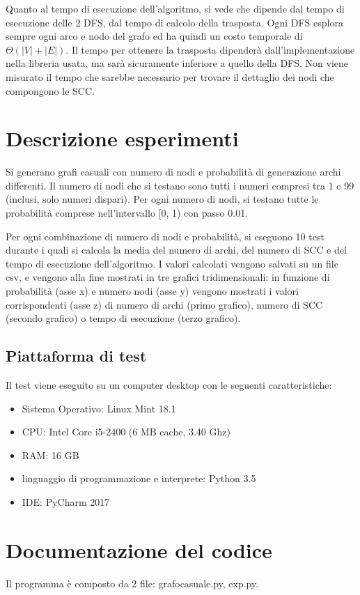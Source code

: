 \documentclass[]{article}
\begin{document}
Quanto al tempo di esecuzione dell'algoritmo, si vede che dipende dal tempo di esecuzione delle 2 DFS, dal tempo di calcolo della trasposta. Ogni DFS esplora sempre ogni arco e nodo del grafo ed ha quindi un costo temporale di $\Theta(|V|+|E|)$. Il tempo per ottenere la trasposta dipenderà dall'implementazione nella libreria usata, ma sarà sicuramente inferiore a quello della DFS. Non viene misurato il tempo che sarebbe necessario per trovare il dettaglio dei nodi che compongono le SCC.

\section{Descrizione esperimenti}
Si generano grafi casuali con numero di nodi e probabilità di generazione archi differenti.
Il numero di nodi che si testano sono tutti i numeri compresi tra 1 e 99 (inclusi, solo numeri dispari). Per ogni numero di nodi, si testano tutte le probabilità comprese nell'intervallo [0, 1) con passo 0.01.

Per ogni combinazione di numero di nodi e probabilità, si eseguono 10 test durante i quali si calcola la media del numero di archi, del numero di SCC e del tempo di esecuzione dell'algoritmo. I valori calcolati vengono salvati su un file csv, e vengono alla fine mostrati in tre grafici tridimensionali: in funzione di probabilità (asse x) e numero nodi (asse y) vengono mostrati i valori corrispondenti (asse z) di numero di archi (primo grafico), numero di SCC (secondo grafico) o tempo di esecuzione (terzo grafico).

\subsection*{Piattaforma di test}
Il test viene eseguito su un computer desktop con le seguenti caratteristiche:
\begin{itemize}
\item Sistema Operativo: Linux Mint 18.1
\item CPU: Intel Core i5-2400 (6 MB cache, 3.40 Ghz)
\item RAM: 16 GB
\item linguaggio di programmazione e interprete: Python 3.5
\item IDE: PyCharm 2017
\end{itemize}

\section{Documentazione del codice}
Il programma è composto da 2 file: grafocasuale.py, exp.py.
\end{document}
